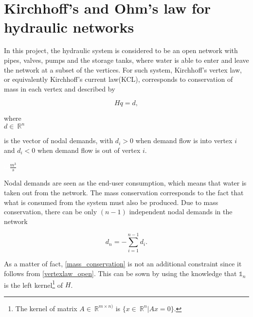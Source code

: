 \section{Kirchhoff's and Ohm's law for hydraulic networks}
\label{kirchhoffs_law}

In this project, the hydraulic system is considered to be an open network with pipes, valves, pumps and the storage tanks, where water is able to enter and leave the network at a subset of the vertices. For such system, Kirchhoff's vertex law, or equivalently Kirchhoff's current law(KCL), corresponds to conservation of mass in each vertex and described by

\begin{equation}
  \label{vertexlaw_open}
  Hq = d,
\end{equation}

  \begin{minipage}[t]{0.20\textwidth}
where\\
\hspace*{8mm} $d \in \: \mathbb{R}^{n}$ 
\end{minipage}
\begin{minipage}[t]{0.68\textwidth}
\vspace*{2mm}
is the vector of nodal demands, with $d_i > 0$ when demand flow is into vertex $i$ and $d_i < 0$ when demand flow is out of vertex $i$.
\end{minipage}
\begin{minipage}[t]{0.10\textwidth}
\vspace*{2mm}
\textcolor{White}{te}$\unit{\frac{m^3}{s}}$
\end{minipage}

Nodal demands are seen as the end-user consumption, which means that water is taken out from the network. The mass conservation corresponds to the fact that what is consumed from the system must also be produced. Due to mass conservation, there can be only $(n-1)$ independent nodal demands in the network

\begin{equation}
  \label{mass_conservation}
  d_n = - \sum_{i=1}^{n-1} d_i.
\end{equation}

As a matter of fact, \eqref{mass_conservation} is not an additional constraint since it follows from \eqref{vertexlaw_open}. This can be sown by using the knowledge that $\mathds{1}_n$ is the left kernel\footnote{The kernel of matrix $A \in \: \mathbb{R}^{m \times n)}$ is $ \{x \in \: \mathbb{R}^{n} | Ax = 0 \} $.} of $H$.

